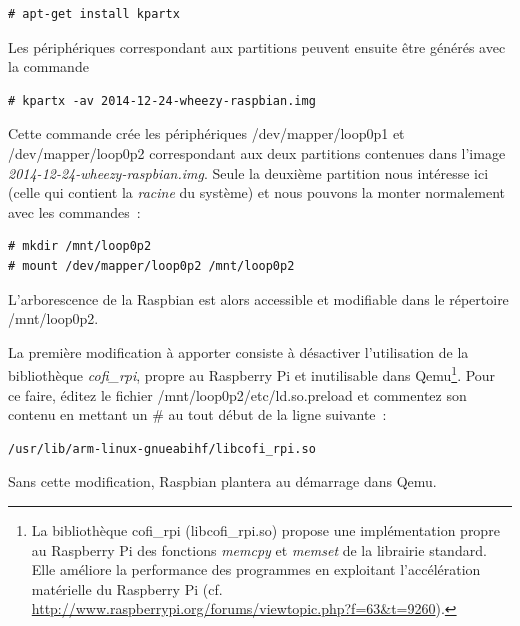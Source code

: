 \documentclass{article}
\begin{document}
\begin{verbatim}
# apt-get install kpartx
\end{verbatim}



Les périphériques correspondant aux partitions peuvent ensuite être générés avec la commande

\begin{verbatim}
# kpartx -av 2014-12-24-wheezy-raspbian.img
\end{verbatim}

Cette commande crée les périphériques /dev/mapper/loop0p1 et
/dev/mapper/loop0p2 correspondant aux deux partitions contenues dans l'image
{\em 2014-12-24-wheezy-raspbian.img}.
Seule la deuxième partition nous intéresse ici (celle qui contient la {\em
racine} du système) et nous pouvons la monter normalement avec les commandes~:
\begin{verbatim}
# mkdir /mnt/loop0p2
# mount /dev/mapper/loop0p2 /mnt/loop0p2
\end{verbatim}

L'arborescence de la Raspbian est alors accessible et modifiable dans le
répertoire \og{}/mnt/loop0p2\fg{}.

La première modification à apporter consiste à désactiver l'utilisation
de la bibliothèque {\em cofi\_rpi}, propre au Raspberry Pi et inutilisable dans
Qemu\footnote{La bibliothèque cofi\_rpi (libcofi\_rpi.so) propose une
    implémentation propre au Raspberry Pi des fonctions {\em memcpy} et {\em
    memset} de la librairie standard. Elle améliore la performance des
    programmes en exploitant l'accélération matérielle du Raspberry Pi (cf.
    \url{http://www.raspberrypi.org/forums/viewtopic.php?f=63&t=9260}).
}.
Pour ce faire, éditez le fichier \og{}/mnt/loop0p2/etc/ld.so.preload\fg{} et
commentez son contenu en mettant un \# au tout début de la ligne suivante~:
\begin{verbatim}
/usr/lib/arm-linux-gnueabihf/libcofi_rpi.so
\end{verbatim}
Sans cette modification, Raspbian plantera au démarrage dans Qemu.
\end{document}
